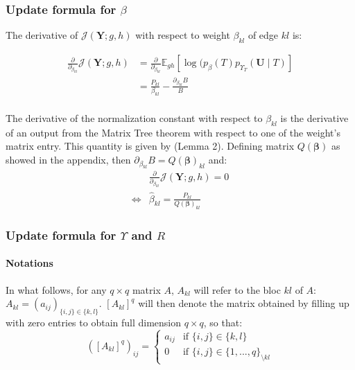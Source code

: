 \documentclass[11pt,a4paper]{article}
\newcommand{\betabf}{\boldsymbol{\beta}}
\newcommand{\Ybf}{\boldsymbol{Y}}
\newcommand{\Ubf}{\boldsymbol{U}}
\newcommand{\Esp}{\mathds{E}}
\begin{document}
 \subsubsection{Update formula for $\beta$}
 The derivative of $ \mathcal{J}(\Ybf ; g,h)$ with respect to weight $\beta_{kl}$ of edge $kl$ is:
 
 \begin{align*}
\frac{\partial}{\partial_{\beta_{kl}}} \mathcal{J}(\Ybf ; g,h) &=  \frac{\partial}{\partial_{\beta_{kl}}} \Esp_{gh} [\log (p_\beta(T)p_{\Upsilon_T}(\Ubf\mid T) ] \\
&= \frac{P_{kl}}{\beta_{kl}} - \frac{\partial_{\beta_{kl}} B }{B} \\
\end{align*}

The derivative of the normalization constant with respect to $\beta_{kl}$ is the derivative of an output from the Matrix Tree theorem with respect to one of the weight's matrix entry. This quantity is given by \citet{Meila} (Lemma 2). Defining matrix $Q(\betabf)$ as showed in the appendix, then $\partial_{\beta_{kl}} B = Q(\betabf)_{kl}$ and:
 \begin{align*}
&\frac{\partial}{\partial_{\beta_{kl}}} \mathcal{J}(\Ybf ; g,h) 
=0 \\
\iff & \boxed{\widehat{\beta}_{kl} = \frac{P_{kl}}{ Q(\betabf)_{kl}} }
\end{align*}

 \subsubsection{Update formula for $\Upsilon$ and $R$}
 \paragraph{Notations\\}
In what follows, for any $q\times q$  matrix $A$, $A_{kl}$ will refer to the bloc $kl$ of $A$: $A_{kl}=(a_{ij})_{\{i,j\}\in\{k,l\}}$.   $[A_{kl}]^q$ will then denote the matrix obtained by filling up with zero entries to obtain full dimension $q\times q$, so that:
$$([A_{kl}]^q )_{ij}=\left\{ \begin{array}{rl}
a_{ij} & \text{if } \{i,j\}\in\{k,l\}\\
0 &  \text{if } \{i,j\}\in\{1,..., q\}_{\setminus kl}
\end{array}\right.$$

 
\end{document}

